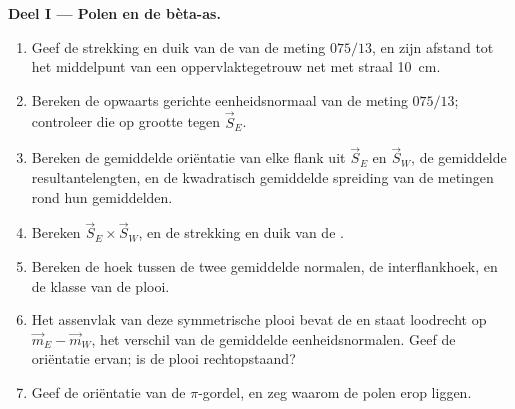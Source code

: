 \begin{problem}
\medskip\noindent\textbf{Deel I --- Polen en de bèta-as.}
\begin{enumerate}
  \item Geef de strekking en duik van de  van de meting $075/13$, en
        zijn afstand tot het middelpunt van een oppervlaktegetrouw net met straal
        \qty{10}{cm}.
  \item Bereken de opwaarts gerichte eenheidsnormaal van de meting $075/13$; controleer die
        op grootte tegen $\vec S_E$.
  \item Bereken de gemiddelde oriëntatie van elke flank uit $\vec S_E$ en $\vec S_W$,
        de gemiddelde resultantelengten, en de kwadratisch gemiddelde spreiding van de
        metingen rond hun gemiddelden.
  \item Bereken $\vec S_E\times\vec S_W$, en de strekking en duik van de
        .
  \item Bereken de hoek tussen de twee gemiddelde normalen, de interflankhoek,
        en de klasse van de plooi.
  \item Het assenvlak van deze symmetrische plooi bevat de  en staat
        loodrecht op $\vec m_E - \vec m_W$, het verschil van de gemiddelde
        eenheidsnormalen. Geef de oriëntatie ervan; is de plooi rechtopstaand?
  \item Geef de oriëntatie van de $\pi$-gordel, en zeg waarom de polen
        erop liggen.
\end{enumerate}


\end{problem}
